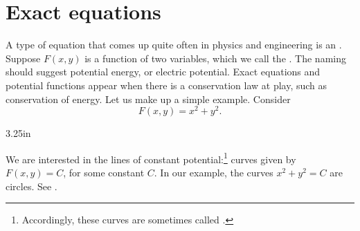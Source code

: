 \sectionnewpage
\section{Exact equations}
\label{exact:section}



A type of equation that comes up quite often in physics and
engineering is an
\emph{}.
Suppose $F(x,y)$ is a function of two variables, which we call the
\emph{}.  The naming should suggest
potential energy, or electric potential.  Exact equations and potential
functions appear when there is a conservation law at play, such as
conservation of energy.
Let us make up a simple example.  Consider
\begin{equation*}
F(x,y) = x^2+y^2 .
\end{equation*}

\begin{mywrapfig}[16]{3.25in}
\capstart
{}
\caption{Solutions to $F(x,y) = x^2+y^2 = C$ for various
$C$.\label{exact:circlesfig}}
\end{mywrapfig}
We are interested in the lines of constant potential:\footnote{Accordingly,
these curves are sometimes called \emph{}.}
curves given by $F(x,y) = C$,
for some constant $C$.  In
our example, the curves $x^2+y^2=C$ are circles.  See
.

